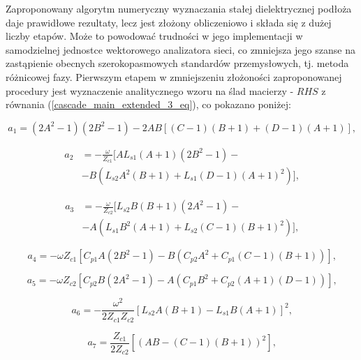 Zaproponowany algorytm numeryczny wyznaczania stałej dielektrycznej podłoża daje prawidłowe rezultaty, lecz jest złożony obliczeniowo i składa się z dużej liczby etapów. Może to powodować trudności w jego implementacji w samodzielnej jednostce wektorowego analizatora sieci, co zmniejsza jego szanse na zastąpienie obecnych szerokopasmowych standardów przemysłowych, tj. metoda różnicowej fazy. Pierwszym etapem w zmniejszeniu złożoności zaproponowanej procedury jest wyznaczenie analitycznego wzoru na ślad macierzy - $RHS$  z równania (\ref{cascade_main_extended_3_eq}), co pokazano poniżej:

\begin{equation}
    a_1 = (2A^2-1)(2B^2-1)-2AB[(C-1)(B+1)+(D-1)(A+1)] \text{,}
\end{equation}

\begin{equation}
    \begin{split}
    a_2 & = -\frac{\omega}{Z_{c1}}[AL_{s1}(A+1)(2B^2-1)-\\
    & -B(L_{s2}A^2(B+1)+L_{s1}(D-1)(A+1)^2)] \text{,}
    \end{split}
\end{equation}

\begin{equation}
    \begin{split}
    a_3 & = -\frac{\omega}{Z_{c2}}[L_{s2}B(B+1)(2A^2-1)-\\
    & -A(L_{s1}B^2(A+1)+L_{s2}(C-1)(B+1)^2)] \text{,}
    \end{split}
\end{equation}

\begin{equation}
    a_4 = -\omega Z_{c1}[C_{p1}A(2B^2-1)-B(C_{p2}A^2+C_{p1}(C-1)(B+1))] \text{,}
\end{equation}

\begin{equation}
    a_5 = -\omega Z_{c2}[C_{p2}B(2A^2-1)-A(C_{p1}B^2+C_{p2}(A+1)(D-1))] \text{,}
\end{equation}

\begin{equation}
    a_6 = -\frac{\omega^2}{2Z_{c1}Z_{c2}}[L_{s2}A(B+1)-L_{s1}B(A+1)]^2 \text{,}
\end{equation}

\begin{equation}
    a_7 = \frac{Z_{c1}}{2Z_{c2}}[(AB-(C-1)(B+1))^2] \text{,}
\end{equation}


